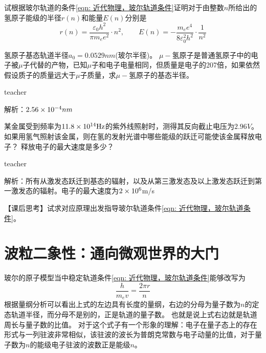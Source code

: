 \begin{example}
试根据玻尔轨道的条件\ref{eqn: 近代物理，玻尔轨道条件}证明对于由整数$n$所给出的氢原子能级的半径$r(n)$和能量$E(n)$分别是
\begin{equation}
r(n)=\frac{\varepsilon_0 h^2}{\pi m_ee^2}\cdot n^2,\qquad E(n)=-\frac{m_ee^4}{8\varepsilon_0^2h^2}\cdot\frac{1}{n^2}
\end{equation}
\end{example}



\begin{example}
氢原子基态轨道半径$a_0 = 0.0529\unit{nm}$(玻尔半径)。
$\mu-$氢原子是普通氢原子中的电子被$\mu$子代替的产物，已知$\mu$子和电子电量相同，但质量是电子的207倍，如果依然假设质子的质量远大于$\mu$子质量，求$\mu-$氢原子的基态半径。

\begin{taggedblock}{teacher}

解析：$2.56 \times 10^{-4} nm$
\end{taggedblock}
\end{example}




\begin{example}
某金属受到频率为$11.8\times 10^{14}{\rm{Hz}}$的紫外线照射时，测得其反向截止电压为$2.96\unit{V}$。
如果用氢气照射该金属，则在氢的发射光谱中哪些能级的跃迁可能使该金属释放电子？
释放电子的最大速度是多少？

\begin{taggedblock}{teacher}

解析：所有从激发态跃迁到基态的辐射，以及从第三激发态及以上激发态跃迁到第一激发态的辐射。电子的最大速度为$2\times 10^{6}$m/s
\end{taggedblock}
\end{example}


\begin{example}
【课后思考】试求对应原理出发指导玻尔轨道条件\ref{eqn: 近代物理，玻尔轨道条件}。

\end{example}





\section{波粒二象性：通向微观世界的大门}
玻尔的原子模型当中稳定轨道条件\ref{eqn: 近代物理，玻尔轨道条件}能够改写为
\begin{equation}
\frac{h}{m_ev}=\frac{2\pi r}{n}
\end{equation}
根据量纲分析可以看出上式的左边具有长度的量纲，右边的分母为量子数为$n$的定态轨道半径，而分母不是别的，正是轨道的量子数。
也就是说上式右边就是轨道周长与量子数的比值。
对于这个式子有一个形象的理解：电子在量子态上的存在形式与一列驻波非常相似，该驻波的波长为普朗克常数与电子动量的比值，对于量子数为$n$的能级电子驻波的波数正是能级$n$。

